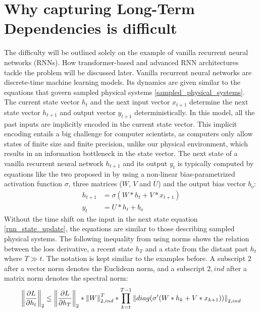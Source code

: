 \documentclass[draft,final]{vutinfth} %
\begin{document}
    \section{Why capturing Long-Term Dependencies is difficult} \label{long_term_difficult}
    The difficulty will be outlined solely on the example of vanilla recurrent neural networks (RNNs).
    How transformer-based and advanced RNN architectures tackle the problem will be discussed later.
    Vanilla recurrent neural networks are discrete-time machine learning models.
    Its dynamics are given similar to the equations that govern sampled physical systems \ref{sampled_physical_systems}.
    The current state vector $h_{t}$ and the next input vector $x_{t+1}$ determine the next state vector $h_{t+1}$ and output vector $y_{t+1}$ deterministically.
    In this model, all the past inputs are implicitly encoded in the current state vector.
    This implicit encoding entails a big challenge for computer scientists, as computers only allow states of finite size and finite precision, unlike our physical environment, which results in an information bottleneck in the state vector.
    The next state of a vanilla recurrent neural network $h_{t+1}$ and its output $y_{t}$ is typically computed by equations like the two proposed in \cite[p. 2]{UnitaryRNNs} by using a non-linear bias-parametrized activation function $\sigma$, three matrices ($W$, $V$ and $U$) and the output bias vector $b_o$:
    \begin{align}
        \label{rnn_state_update}
        h_{t+1} &= \sigma(W*h_t + V*x_{t+1}) \\
        \label{rnn_output}
        y_{t} &= U*h_{t} + b_o
    \end{align}
    Without the time shift on the input in the next state equation \ref{rnn_state_update}, the equations are similar to those describing sampled physical systems.
    The following inequality from \cite[p. 2]{UnitaryRNNs} using norms shows the relation between the loss derivative, a recent state $h_T$ and a state from the distant past $h_t$ where $T \gg t$.
    The notation is kept similar to the examples before. A subscript $2$ after a vector norm denotes the Euclidean norm, and a subscript $2,ind$ after a matrix norm denotes the spectral norm:
    \begin{align}
        \label{gradient_formula}
        \left\Vert \pdv{L}{h_t} \right\Vert_2 \leq \left\Vert \pdv{L}{h_T} \right\Vert_2 * \left\Vert W \right\Vert_{2,ind}^T * \prod^{T-1}_{k=t} \left\Vert diag(\sigma'(W*h_k + V*x_{k+1})) \right\Vert_{2,ind}
    \end{align}
\end{document}
